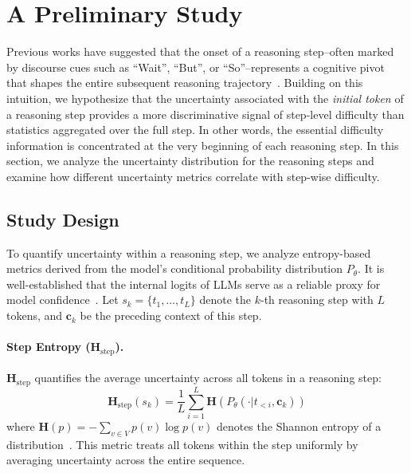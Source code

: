 \documentclass[11pt]{article}
\begin{document}
\section{A Preliminary Study}
\label{sec:motivation}
Previous works have suggested that the onset of a reasoning step--often marked by discourse cues such as ``Wait'', ``But'', or ``So''--represents a cognitive pivot that shapes the entire subsequent reasoning trajectory~\cite{wang2025beyond,yang2025speculative,zeng2025pruning,zhang2025gam}. Building on this intuition, we hypothesize that the uncertainty associated with the \textit{initial token} of a reasoning step provides a more discriminative signal of step-level difficulty than statistics aggregated over the full step. In other words, the essential difficulty information is concentrated at the very beginning of each reasoning step. 
In this section, we analyze the uncertainty distribution for the reasoning steps and examine how different uncertainty metrics correlate with step-wise difficulty.

\subsection{Study Design}
\label{ssec:metrics}
To quantify uncertainty within a reasoning step, we analyze entropy-based metrics derived from the model’s conditional probability distribution $P_\theta$. It is well-established that the internal logits of LLMs serve as a reliable proxy for model confidence~\cite{malinin2020uncertainty, kuhn2023semantic}. 
Let \(s_k=\{t_1,\ldots,t_L\}\) denote the \(k\)-th reasoning step with \(L\) tokens, and \(\mathbf{c}_k\) be the preceding context of this step.

\paragraph{Step Entropy ($\mathbf{H}_\text{step}$).} $\mathbf{H}_\text{step}$ quantifies the average uncertainty across all tokens in a reasoning step:
\vspace{-20pt}
\begin{equation}
    \mathbf{H}_\text{step}(s_k) = \frac{1}{L} \sum_{i=1}^{L} \mathbf{H}(P_\theta(\cdot | t_{<i}, \mathbf{c}_k))
\end{equation}
where $\mathbf{H}(p) = - \sum_{v \in V} p(v) \log p(v)$ denotes the Shannon entropy of a distribution~\cite{shannon1948mathematical}. 
This metric treats all tokens within the step uniformly by averaging uncertainty across the entire sequence.
\end{document}
